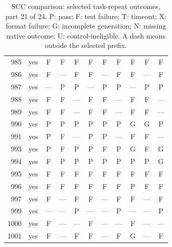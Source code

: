 \begin{table}[p]
\begin{tabular*}{\textwidth}{@{\extracolsep{\fill}}rc*{9}{c}@{}}
985 & yes & F & F & F & F & F & F & F & F & F\\
986 & yes & F & — & F & F & — & F & F & — & F\\
987 & yes & — & P & P & — & P & P & — & P & P\\
988 & yes & F & F & — & F & F & — & F & F & —\\
989 & yes & F & F & — & F & F & — & F & F & —\\
990 & yes & P & P & P & P & P & P & G & G & P\\
991 & yes & P & F & — & P & P & — & F & F & —\\
993 & yes & P & F & P & P & F & P & G & F & G\\
994 & yes & F & P & P & P & P & P & P & P & G\\
995 & yes & F & F & F & F & F & F & F & F & F\\
996 & yes & F & F & F & F & F & F & P & F & F\\
997 & yes & F & — & F & F & — & F & F & — & F\\
999 & yes & — & — & P & — & — & P & — & — & P\\
1000 & yes & F & — & — & F & — & — & F & — & —\\
1001 & yes & F & — & F & F & — & F & G & — & F\\
\bottomrule\end{tabular*}
\caption{SCC comparison: selected task-repeat outcomes, part 21 of 24. P: pass; F: test failure; T: timeout; X: format failure; G: incomplete generation; N: missing native outcome; U: control-ineligible. A dash means outside the selected prefix.}
\end{table}
\clearpage
